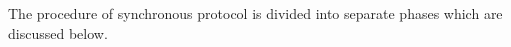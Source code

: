 The procedure of synchronous protocol is divided into separate phases which are discussed below. 


